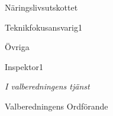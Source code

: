 \documentclass[../_main/handlingar.tex]{subfiles}
\begin{document}

\begin{valforslagslista}
    \begin{utskott}{Näringslivsutskottet}
        \begin{post}{Teknikfokusansvarig}{1}
        \end{post}
    \end{utskott}
    \begin{utskott}{Övriga}
        \begin{post}{Inspektor}{1}
        \end{post}
    \end{utskott}
\end{valforslagslista}

\begin{signatures}{1}
\emph{I valberedningens tjänst}
\signature{Elin Magnusson}{Valberedningens Ordförande}
\end{signatures}
\end{document}
